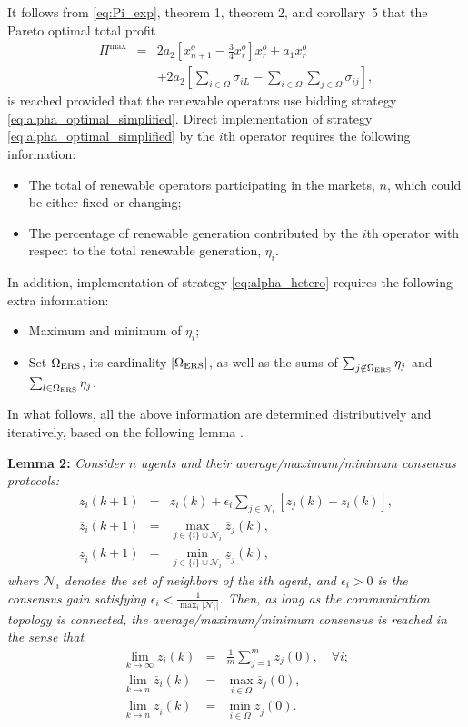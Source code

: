 \documentclass[conference]{IEEEtran}
\begin{document}
It follows from \eqref{eq:Pi_exp}, theorem 1, theorem 2, and corollary~5 that the Pareto optimal total profit 
\begin{eqnarray*}
    \Pi^{\max}  
     & = & 2a_2\left[  x_{n+1}^o - \frac{3}{4} x_r^o \right]x_r^o   +a_1 x_r^o  \nonumber \\ && 
     + 2a_2 \left[ \sum_{i\in\Omega} \sigma_{iL} -\sum_{i\in\Omega}\sum_{j\in\Omega}\sigma_{ij}\right],
\end{eqnarray*}
is reached provided that the renewable operators use bidding strategy \eqref{eq:alpha_optimal_simplified}.
Direct implementation of strategy \eqref{eq:alpha_optimal_simplified} by the $i$th operator requires the following information:
\begin{itemize}
    \item The total of renewable operators participating in the markets, $n$, which could be either fixed or changing; 
    \item The percentage of renewable generation contributed by the $i$th operator with respect to the total renewable generation, $\eta_i$.
\end{itemize}
In addition, implementation of strategy \eqref{eq:alpha_hetero} requires the following extra information:
\begin{itemize}
    \item Maximum and minimum of $\eta_i$; 
    \item Set $\Omega_{\rm ERS}$, its cardinality $|\Omega_{\rm ERS}|$, as well as the sums of $\sum_{j\not\in\Omega_{\rm ERS}}\eta_j$ and $\sum_{l\in\Omega_{\rm ERS}}\eta_j$.
\end{itemize}
In what follows, all the above information are determined distributively and iteratively, based on the following lemma \cite{qu}. 

\noindent \textbf{Lemma 2:} {\it Consider $n$ agents and their average/maximum/minimum consensus protocols:
\begin{eqnarray*}
z_i(k+1) & = & z_i(k) + \epsilon_i \sum_{j \in \mathcal{N}_i} [z_j(k) - z_i(k)], \label{eq:consensus} \\
\overline{z}_i(k+1) & = & \max_{j\in\{i\}\cup\mathcal{N}_i} \overline{z}_j(k), \label{eq:max} \\
\underline{z}_i(k+1) & = & \min_{j\in\{i\}\cup\mathcal{N}_i} \underline{z}_j(k), \label{eq:min}
\end{eqnarray*}
where $\mathcal{N}_i$ denotes the set of neighbors of the $i$th agent, and $\epsilon_i > 0$ is the consensus gain satisfying $\epsilon_i < \tfrac{1}{\max_i |\mathcal{N}_i|}$. Then, as long as the communication topology is connected, the average/maximum/minimum consensus is reached in the sense that  
\begin{eqnarray*}
\lim_{k \to \infty} z_i(k) & = & \frac{1}{m}\sum_{j=1}^m z_j(0), \quad \forall i; \\
\lim_{k \to n} \overline{z}_i(k) & = & \max_{i\in\Omega} \overline{z}_j(0), \\
\lim_{k \to n} \underline{z}_i(k) & = & \min_{i\in\Omega} \underline{z}_j(0).
\end{eqnarray*}
}
\end{document}
